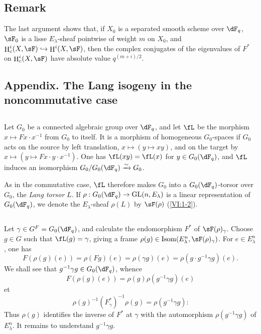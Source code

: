 \documentclass[12pt,oneside,english]{smfbook}
\DeclareMathOperator{\gl}{GL}
\DeclareMathOperator{\h}{H}
\newcommand{\iso}{\xrightarrow\sim}
\begin{document}
\subsection{Remark}\label{VI:1-21}

The last argument shows that, if $X_0$ is a separated smooth scheme over $\dF_q$, $\sF_0$ is a lisse $E_\lambda$-sheaf pointwise of weight $m$ on $X_0$, and $\h_c^i(X,\sF)\hookrightarrow\h^i(X,\sF)$, then the complex conjugates of the eigenvalues of $F^\ast$ on $\h_c^i(X,\sF)$ have absolute value $q^{(m+i)/2}$.

\subsection*{Appendix. The Lang isogeny in the noncommutative case}

\subsection{}\label{VI:1-22}

Let $G_0$ be a connected algebraic group over $\dF_q$, and let $\fL$ be the morphism $x\mapsto Fx\cdot x^{-1}$ from $G_0$ to itself. It is a morphism of homogeneous $G_0$-spaces if $G_0$ acts on the source by left translation, $x\mapsto(y\mapsto xy)$, and on the target by $x\mapsto(y\mapsto Fx\cdot y\cdot x^{-1})$. One has $\fL(xy)=\fL(x)$ for $y\in G_0(\dF_q)$, and $\fL$ induces an isomorphism $G_0/G_0(\dF_q)\iso G_0$.

As in the commutative case, $\fL$ therefore makes $G_0$ into a $G_0(\dF_q)$-torsor over $G_0$, the \emph{Lang torsor} $L$. If $\rho:G_0(\dF_q)\to\gl(n,E_\lambda)$ is a linear representation of $G_0(\dF_q)$, we denote the $E_\lambda$-sheaf $\rho(L)$ by $\sF(\rho)$ (\ref{VI:1-2}).

\subsection{}\label{VI:1-23}

Let $\gamma\in G^F=G_0(\dF_q)$, and calculate the endomorphism $F^\ast$ of $\sF(\rho)_\gamma$. Choose $g\in G$ such that $\fL(g)=\gamma$, giving a frame $\rho(g)\in\operatorname{Isom}(E_\lambda^n,\sF(\rho)_\gamma)$. For $e\in E_\lambda^n$, one has
\[
  F(\rho(g)(e)) = \rho(F g)(e) = \rho(\gamma g)(e) = \rho(g\cdot g^{-1}\gamma g)(e) \text{.}
\]
We shall see that $g^{-1}\gamma g\in G_0(\dF_q)$, whence
\[
  F(\rho(g)(e)) = \rho(g) \rho(g^{-1}\gamma g)(e)
\]
et
\begin{equation*}\tag{1.23.1}\label{VI:eq:1-23-1}
  \rho(g)^{-1} (F_\gamma^\ast)^{-1} \rho(g) = \rho(g^{-1} \gamma g) \text{:}
\end{equation*}
Thus $\rho(g)$ identifies the inverse of $F^\ast$ at $\gamma$ with the automorphism $\rho(g^{-1}\gamma g)$ of $E_\lambda^n$. It remains to understand $g^{-1}\gamma g$.
\end{document}
